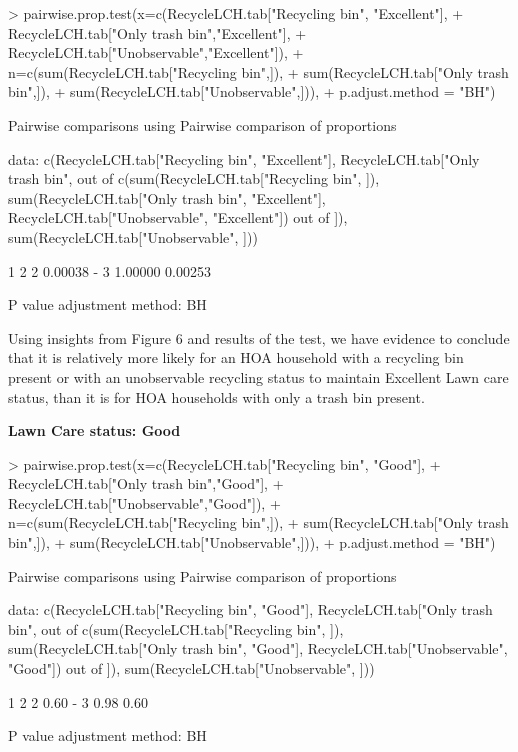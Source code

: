 \documentclass{article}
\begin{document}
\begin{Schunk}
\begin{Sinput}
> pairwise.prop.test(x=c(RecycleLCH.tab["Recycling bin", "Excellent"],
+   RecycleLCH.tab["Only trash bin","Excellent"], 
+       RecycleLCH.tab["Unobservable","Excellent"]), 
+       n=c(sum(RecycleLCH.tab["Recycling bin",]), 
+       sum(RecycleLCH.tab["Only trash bin",]), 
+       sum(RecycleLCH.tab["Unobservable",])),
+       p.adjust.method = "BH")
\end{Sinput}
\begin{Soutput}
	Pairwise comparisons using Pairwise comparison of proportions 

data:  c(RecycleLCH.tab["Recycling bin", "Excellent"], RecycleLCH.tab["Only trash bin",  out of c(sum(RecycleLCH.tab["Recycling bin", ]), sum(RecycleLCH.tab["Only trash bin",      "Excellent"], RecycleLCH.tab["Unobservable", "Excellent"]) out of     ]), sum(RecycleLCH.tab["Unobservable", ])) 

  1       2      
2 0.00038 -      
3 1.00000 0.00253

P value adjustment method: BH 
\end{Soutput}
\end{Schunk}

Using insights from Figure 6 and results of the test, we have evidence to conclude that it is relatively more likely for an HOA household with a recycling bin present or with an unobservable recycling status to maintain Excellent Lawn care status, than it is for HOA households with only a trash bin present.

\textbf{Lawn Care status: Good}

\begin{Schunk}
\begin{Sinput}
> pairwise.prop.test(x=c(RecycleLCH.tab["Recycling bin", "Good"],
+   RecycleLCH.tab["Only trash bin","Good"], 
+       RecycleLCH.tab["Unobservable","Good"]), 
+       n=c(sum(RecycleLCH.tab["Recycling bin",]), 
+       sum(RecycleLCH.tab["Only trash bin",]), 
+       sum(RecycleLCH.tab["Unobservable",])),
+       p.adjust.method = "BH")
\end{Sinput}
\begin{Soutput}
	Pairwise comparisons using Pairwise comparison of proportions 

data:  c(RecycleLCH.tab["Recycling bin", "Good"], RecycleLCH.tab["Only trash bin",  out of c(sum(RecycleLCH.tab["Recycling bin", ]), sum(RecycleLCH.tab["Only trash bin",      "Good"], RecycleLCH.tab["Unobservable", "Good"]) out of     ]), sum(RecycleLCH.tab["Unobservable", ])) 

  1    2   
2 0.60 -   
3 0.98 0.60

P value adjustment method: BH 
\end{Soutput}
\end{Schunk}
\end{document}
